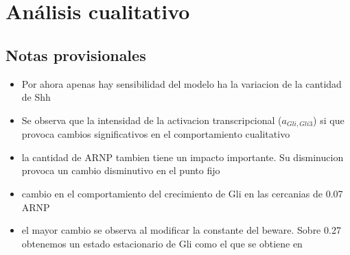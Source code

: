 \chapter{Análisis cualitativo}

\label{ch:simulation}


\section{Notas provisionales}
\begin{itemize}
	\item Por ahora apenas hay sensibilidad del modelo ha la variacion de la cantidad de Shh
	\item Se observa que la intensidad de la activacion transcripcional ($a_{Gli,Gli3}$) si que provoca cambios significativos en el comportamiento cualitativo
	\item la cantidad de ARNP tambien tiene un impacto importante. Su disminucion provoca un cambio disminutivo en el punto fijo
	\item cambio en el comportamiento del crecimiento de Gli en las cercanias de 0.07 ARNP
	\item el mayor cambio se observa al modificar la constante del beware. Sobre 0.27 obtenemos un estado estacionario de Gli como el que se obtiene en \cite{schaffer}
\end{itemize}




